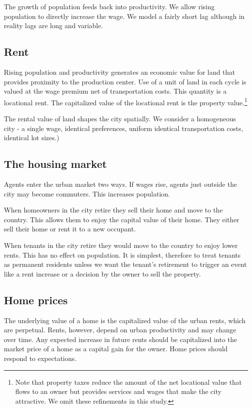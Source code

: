The growth of population feeds back into productivity. We allow rising population to directly increase the wage.  We model a fairly short lag although in reality lags are long and variable. 



\subsection{Rent}
Rising population and productivity generates an economic value for land that provides proximity to the production center. Use of a unit of land in each cycle is valued at the wage premium net of transportation costs. This quantity is a locational rent. The capitalized value of the locational rent is the property value.\footnote{Note that property taxes reduce the amount of the net locational value that flows to an owner but provides services and wages that make the city attractive. We omit these refinements in this study.}


The rental value of land shapes the city spatially.  We consider a homogeneous city - a single wage, identical preferences, uniform identical transportation costs, identical lot sizes.)



\subsection{The housing market}
Agents enter the urban market two ways. If wages rise, agents just outside the city may become commuters. This increases population. 

When homeowners in the city   retire they sell their home and move to the country. This allows them  to enjoy the capital value of their home.  They either sell their home or rent it to a new occupant. 

When  tenants  in the city  retire they would move to the country to enjoy lower rents. This has no effect on population. It is simplest, therefore to treat tenants as permanent residents unless we want the tenant's  retirement to trigger an event like a rent increase or a decision by the owner to sell the property.



\subsection{Home prices}
The underlying value of a home is the capitalized value of the urban rents, which are perpetual.  Rents, however, depend on urban productivity and may change over time. Any expected increase in future rents should be capitalized into the market price of a home as a capital gain for the owner. Home prices should respond to expectations.

